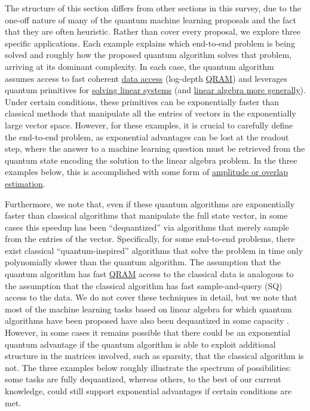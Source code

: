 \begin{refsection}
The structure of this section differs from other sections in this survey, due to the one-off nature of many of the quantum machine learning proposals and the fact that they are often heuristic. Rather than cover every proposal, we explore three specific applications. Each example explains which end-to-end problem is being solved and roughly how the proposed quantum algorithm solves that problem, arriving at its dominant complexity. In each case, the quantum algorithm assumes access to fast coherent \hyperref[prim:LoadingClassicalData]{data access} (log-depth \hyperref[prim:QRAM]{QRAM}) and leverages quantum primitives for \hyperref[prim:QuantumLinearSystemSolvers]{solving linear systems} (and \hyperref[prim:LinearAlgebra]{linear algebra more generally}). Under certain conditions, these primitives can be exponentially faster than classical methods that manipulate all the entries of vectors in the exponentially large vector space. However, for these examples, it is crucial to carefully define the end-to-end problem, as exponential advantages can be lost at the readout step, where the answer to a machine learning question must be retrieved from the quantum state encoding the solution to the linear algebra problem. In the three examples below, this is accomplished with some form of \hyperref[prim:AmpEst]{amplitude or overlap estimation}. 

Furthermore, we note that, even if these quantum algorithms are exponentially faster than classical algorithms that manipulate the full state vector, in some cases this speedup has been ``dequantized'' via algorithms that merely sample from the entries of the vector.  Specifically, for some end-to-end problems, there exist classical ``quantum-inspired'' algorithms \cite{tang2018QInspiredClassAlgPCA,chia2019SampdSubLinLowRankFramework,Shao2022FQILSS} that solve the problem in time only polynomially slower than the quantum algorithm. The assumption that the quantum algorithm has fast \hyperref[prim:QRAM]{QRAM} access to the classical data is analogous to the assumption that the classical algorithm has fast sample-and-query (SQ) access to the data. We do not cover these techniques in detail, but we note that most of the machine learning tasks based on linear algebra for which quantum algorithms have been proposed have also been dequantized in some capacity \cite{chia2019SampdSubLinLowRankFramework}. However, in some cases it remains possible that there could be an exponential quantum advantage if the quantum algorithm is able to exploit additional structure in the matrices involved, such as sparsity, that the classical algorithm is not. The three examples below roughly illustrate the spectrum of possibilities: some tasks are fully dequantized, whereas others, to the best of our current knowledge, could still support exponential advantages if certain conditions are met. 



\end{refsection}
